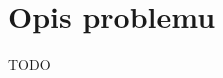 \documentclass[../main.tex]{subfiles}
\begin{document}
	
	
\section{Opis problemu}
TODO
\end{document}
